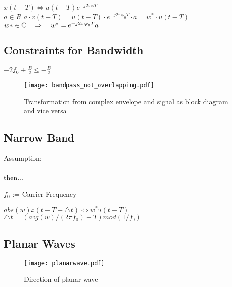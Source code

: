 \null\qquad $ x(t-T) \iff u(t-T) e^{-j2 \pi \varphi T}$\\
\null\qquad $ a \in R $ \pfeil $ a \cdot x(t-T) = u(t-T) \cdot e^{-j 2 \pi \varphi^{}_{0} T} \cdot a= w^{*} \cdot u(t-T)$\\
\null\qquad $ w\ast \in \mathbb{C} \quad\Rightarrow\quad w^{*} = e^{-j 2 \pi \varphi^{}_{0} T} a$\\


\subsection{Constraints for Bandwidth}

\null\qquad $-2f_0+\frac{B}{2} \leq -\frac{B}{2} $ 



\begin{figure}[H]
	\centering
	\texttt{[image: bandpass\_not\_overlapping.pdf]}
	\caption{Transformation from complex envelope and signal as block diagram and vice versa}
	\label{complexEnvelopTransform} 
\end{figure}

\subsection{Narrow Band}

Assumption:\\

\\

then...\\


\null\qquad $f_0$ :=  Carrier Frequency

\null\qquad $abs(w) x(t-T-\triangle t) \iff w^* u(t-T)$
\null\qquad $\triangle t = (avg(w)/(2 \pi f_0) - T) mod(1/f_0)$


\subsection{Planar Waves}
\begin{figure}[H]
	\centering
	\texttt{[image: planarwave.pdf]}
	\caption{Direction of planar wave}
	\label{planarwave} 
\end{figure}


